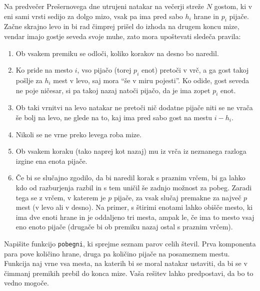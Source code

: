 \documentclass[arhiv]{../izpit}
\begin{document}


\naloga

Na predvečer Prešernovega dne utrujeni natakar na večerji streže $N$ gostom, ki v eni sami vrsti sedijo za dolgo mizo, vsak pa ima pred sabo $h_i$ hrane in $p_i$ pijače. Začne skrajno levo in bi rad čimprej prišel do izhoda na drugem koncu mize, vendar imajo gostje seveda svoje muhe, zato mora upoštevati sledeča pravila:

\begin{enumerate}
  \item Ob vsakem premiku se odloči, koliko korakov na desno bo naredil. 
  \item\label{i:obisk} Ko pride na mesto $i$, vso pijačo (torej $p_i$ enot) pretoči v vrč, a ga gost takoj pošlje za $h_i$ mest v levo, saj mora ``še v miru pojesti''. Ko odide, gost seveda ne poje ničesar, si pa takoj nazaj natoči pijačo, da je ima zopet $p_i$ enot.
  \item Ob taki vrnitvi na levo natakar ne pretoči nič dodatne pijače niti se ne vrača še bolj na levo, ne glede na to, kaj ima pred sabo gost na mestu $i - h_i$.
  \item Nikoli se ne vrne preko levega roba mize.
  \item Ob vsakem koraku (tako naprej kot nazaj) mu iz vrča iz neznanega razloga izgine ena enota pijače.
  \item Če bi se slučajno zgodilo, da bi naredil korak s praznim vrčem, bi ga lahko kdo od razburjenja razbil in s tem uničil še zadnjo možnost za pobeg. Zaradi tega se z vrčem, v katerem je $p$ pijače, za vsak slučaj premakne za največ $p$ mest (v levo ali v desno). Na primer, s štirimi enotami lahko obišče mesto, ki ima dve enoti hrane in je oddaljeno tri mesta, ampak le, če ima to mesto vsaj eno enoto pijače (drugače bi ob premiku nazaj ostal s praznim vrčem).
\end{enumerate}

Napišite funkcijo \verb|pobegni|, ki sprejme seznam parov celih števil. Prva komponenta para pove količino hrane, druga pa količino pijače na posameznem mestu. Funkcija naj vrne vsa mesta, na katerih bi se moral natakar ustaviti, da bi se v čimmanj premikih prebil do konca mize. Vaša rešitev lahko predpostavi, da bo to vedno mogoče.
\end{document}
